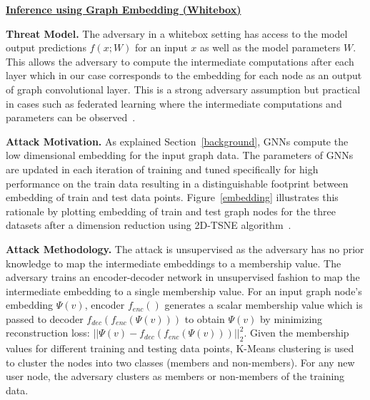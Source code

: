\noindent\textbf{\underline{Inference using Graph Embedding (Whitebox)}}

\noindent\textbf{Threat Model.} The adversary in a whitebox setting has access to the model output predictions $f(x; W)$ for an input $x$ as well as the model parameters $W$.
This allows the adversary to compute the intermediate computations after each layer which in our case corresponds to the embedding for each node as an output of graph convolutional layer.
This is a strong adversary assumption but practical in cases such as federated learning where the intermediate computations and parameters can be observed~\cite{whitebox,collabinf}.

\noindent\textbf{Attack Motivation.} As explained Section~\ref{background}, GNNs compute the low dimensional embedding for the input graph data.
The parameters of GNNs are updated in each iteration of training and tuned specifically for high performance on the train data resulting in a distinguishable footprint between embedding of train and test data points.
Figure~\ref{embedding} illustrates this rationale by plotting embedding of train and test graph nodes for the three datasets after a dimension reduction using 2D-TSNE algorithm~\cite{tsne}.


\noindent\textbf{Attack Methodology.} The attack is unsupervised as the adversary has no prior knowledge to map the intermediate embeddings to a membership value. %
The adversary trains an encoder-decoder network in unsupervised fashion to map the intermediate embedding to a single membership value.
For an input graph node's embedding $\Psi (v)$, encoder $f_{enc}()$ generates a scalar membership value which is passed to decoder $f_{dec}(f_{enc}(\Psi (v)))$ to obtain $\Psi(v)$ by minimizing reconstruction loss: $||\Psi (v) - f_{dec}(f_{enc}(\Psi (v)))||_2^2$.
Given the membership values for different training and testing data points, K-Means clustering is used to cluster the nodes into two classes (members and non-members).
For any new user node, the adversary clusters as members or non-members of the training data.









